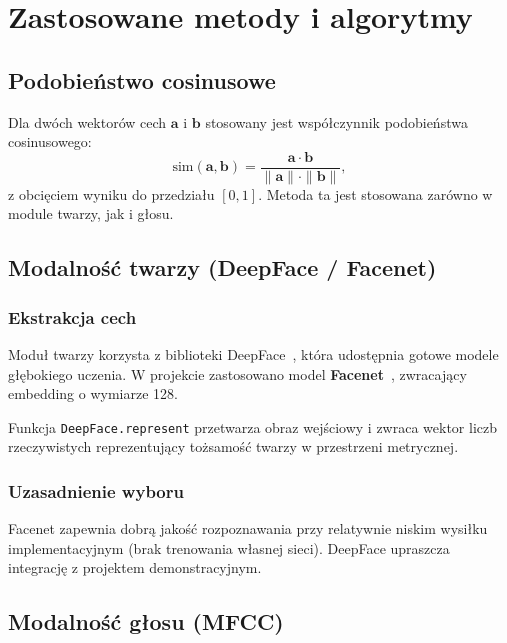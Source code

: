 \chapter{Zastosowane metody i algorytmy}
\label{cha:metody}

\section{Podobieństwo cosinusowe}

Dla dwóch wektorów cech $\mathbf{a}$ i $\mathbf{b}$ stosowany jest współczynnik podobieństwa cosinusowego:
\begin{equation}
    \mathrm{sim}(\mathbf{a}, \mathbf{b}) = \frac{\mathbf{a} \cdot \mathbf{b}}{\|\mathbf{a}\| \cdot \|\mathbf{b}\|},
    \label{eq:cosine}
\end{equation}
z obcięciem wyniku do przedziału $[0, 1]$. Metoda ta jest stosowana zarówno w module twarzy, jak i głosu.

\section{Modalność twarzy (DeepFace / Facenet)}

\subsection{Ekstrakcja cech}

Moduł twarzy korzysta z biblioteki DeepFace~\cite{serengil2020deepface}, która udostępnia gotowe modele głębokiego uczenia. W projekcie zastosowano model \textbf{Facenet}~\cite{schroff2015facenet}, zwracający embedding o wymiarze 128.

Funkcja \texttt{DeepFace.represent} przetwarza obraz wejściowy i zwraca wektor liczb rzeczywistych reprezentujący tożsamość twarzy w przestrzeni metrycznej.

\subsection{Uzasadnienie wyboru}

Facenet zapewnia dobrą jakość rozpoznawania przy relatywnie niskim wysiłku implementacyjnym (brak trenowania własnej sieci). DeepFace upraszcza integrację z projektem demonstracyjnym.

\section{Modalność głosu (MFCC)}

